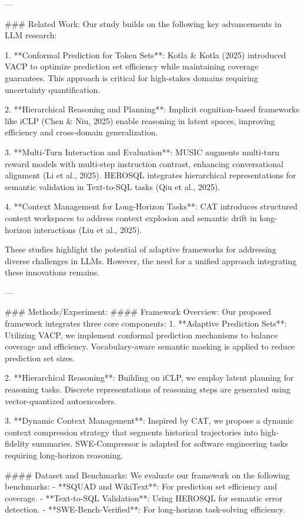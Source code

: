 ---

### Related Work:
Our study builds on the following key advancements in LLM research:

1. **Conformal Prediction for Token Sets**: Kotla & Kotla (2025) introduced VACP to optimize prediction set efficiency while maintaining coverage guarantees. This approach is critical for high-stakes domains requiring uncertainty quantification.

2. **Hierarchical Reasoning and Planning**: Implicit cognition-based frameworks like iCLP (Chen & Niu, 2025) enable reasoning in latent spaces, improving efficiency and cross-domain generalization.

3. **Multi-Turn Interaction and Evaluation**: MUSIC augments multi-turn reward models with multi-step instruction contrast, enhancing conversational alignment (Li et al., 2025). HEROSQL integrates hierarchical representations for semantic validation in Text-to-SQL tasks (Qiu et al., 2025).

4. **Context Management for Long-Horizon Tasks**: CAT introduces structured context workspaces to address context explosion and semantic drift in long-horizon interactions (Liu et al., 2025).

These studies highlight the potential of adaptive frameworks for addressing diverse challenges in LLMs. However, the need for a unified approach integrating these innovations remains.

---

### Methods/Experiment:
#### Framework Overview:
Our proposed framework integrates three core components:
1. **Adaptive Prediction Sets**:
   Utilizing VACP, we implement conformal prediction mechanisms to balance coverage and efficiency. Vocabulary-aware semantic masking is applied to reduce prediction set sizes.
   
2. **Hierarchical Reasoning**:
   Building on iCLP, we employ latent planning for reasoning tasks. Discrete representations of reasoning steps are generated using vector-quantized autoencoders.
   
3. **Dynamic Context Management**:
   Inspired by CAT, we propose a dynamic context compression strategy that segments historical trajectories into high-fidelity summaries. SWE-Compressor is adapted for software engineering tasks requiring long-horizon reasoning.

#### Dataset and Benchmarks:
We evaluate our framework on the following benchmarks:
- **SQUAD and WikiText**: For prediction set efficiency and coverage.
- **Text-to-SQL Validation**: Using HEROSQL for semantic error detection.
- **SWE-Bench-Verified**: For long-horizon task-solving efficiency.

